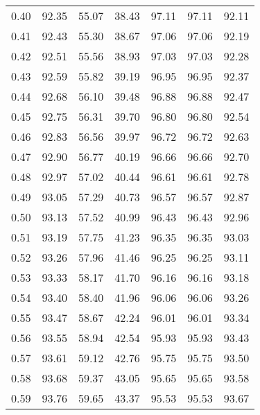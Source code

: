 \begin{tabular}{|c|c|c|c|c|c|c|}
      0.40 &     92.35 &     55.07 &      38.43 &   97.11 &      97.11 &         92.11 \\
      0.41 &     92.43 &     55.30 &      38.67 &   97.06 &      97.06 &         92.19 \\
      0.42 &     92.51 &     55.56 &      38.93 &   97.03 &      97.03 &         92.28 \\
      0.43 &     92.59 &     55.82 &      39.19 &   96.95 &      96.95 &         92.37 \\
      0.44 &     92.68 &     56.10 &      39.48 &   96.88 &      96.88 &         92.47 \\
      0.45 &     92.75 &     56.31 &      39.70 &   96.80 &      96.80 &         92.54 \\
      0.46 &     92.83 &     56.56 &      39.97 &   96.72 &      96.72 &         92.63 \\
      0.47 &     92.90 &     56.77 &      40.19 &   96.66 &      96.66 &         92.70 \\
      0.48 &     92.97 &     57.02 &      40.44 &   96.61 &      96.61 &         92.78 \\
      0.49 &     93.05 &     57.29 &      40.73 &   96.57 &      96.57 &         92.87 \\
      0.50 &     93.13 &     57.52 &      40.99 &   96.43 &      96.43 &         92.96 \\
      0.51 &     93.19 &     57.75 &      41.23 &   96.35 &      96.35 &         93.03 \\
      0.52 &     93.26 &     57.96 &      41.46 &   96.25 &      96.25 &         93.11 \\
      0.53 &     93.33 &     58.17 &      41.70 &   96.16 &      96.16 &         93.18 \\
      0.54 &     93.40 &     58.40 &      41.96 &   96.06 &      96.06 &         93.26 \\
      0.55 &     93.47 &     58.67 &      42.24 &   96.01 &      96.01 &         93.34 \\
      0.56 &     93.55 &     58.94 &      42.54 &   95.93 &      95.93 &         93.43 \\
      0.57 &     93.61 &     59.12 &      42.76 &   95.75 &      95.75 &         93.50 \\
      0.58 &     93.68 &     59.37 &      43.05 &   95.65 &      95.65 &         93.58 \\
      0.59 &     93.76 &     59.65 &      43.37 &   95.53 &      95.53 &         93.67 \\

\end{tabular}
